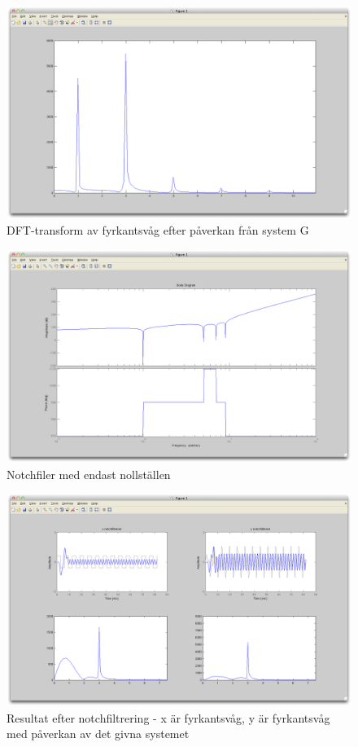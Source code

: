 \documentclass[]{article}
\begin{document}
\begin{figure}[hbt]
  \centering
  \includegraphics[width=15.0cm]{dftY.png}
  \caption{DFT-transform av fyrkantsvåg efter påverkan från system G}
\end{figure}
\begin{figure}[htb]
\includegraphics[width=15.0cm]{baranollst.png}
\caption{Notchfiler med endast nollställen}
\end{figure}
\begin{figure}[htb]
\includegraphics[width=15.0cm]{filterresultat.png}
\caption{Resultat efter notchfiltrering - x är fyrkantsvåg, y är fyrkantsvåg med påverkan av det givna systemet}
\end{figure}


\end{document}
